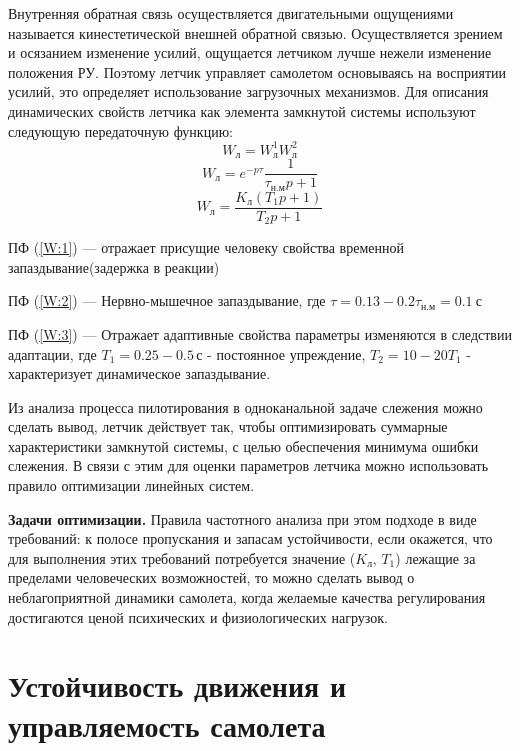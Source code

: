 \documentclass{article}
\begin{document}
Внутренняя обратная связь осуществляется двигательными ощущениями называется
кинестетической внешней обратной связью. Осуществляется зрением и осязанием
изменение усилий, ощущается летчиком лучше нежели изменение положения РУ.
Поэтому летчик управляет самолетом основываясь на восприятии усилий, это
определяет использование загрузочных механизмов. Для описания динамических
свойств летчика как элемента замкнутой системы используют следующую
передаточную функцию:
\begin{equation} \label{W:1}
	W_\text{л} = W_\text{л}^1 W_\text{л}^2
\end{equation}
\begin{equation} \label{W:2}
	W_\text{л} = e^{-p\tau} \frac{1}{\tau_\text{н.м} p +1}
\end{equation}
\begin{equation} \label{W:3}
	W_\text{л} = \frac{K_\text{л}(T_1 p + 1)}{T_2 p +1}
\end{equation}

ПФ (\ref{W:1}) --- отражает присущие человеку свойства временной
запаздывание(задержка в реакции)

ПФ (\ref{W:2}) --- Нервно-мышечное запаздывание, где $\tau = 0.13 - 0.2
	\tau_\text{н.м}= 0.1 \ \text{с}$ 

ПФ (\ref{W:3}) --- Отражает адаптивные свойства параметры изменяются в
следствии адаптации, где $T_1 = 0.25 - 0.5 \, \text{с}$ - постоянное упреждение,
$T_2 = 10 - 20  T_1$ - характеризует динамическое запаздывание.

Из анализа процесса пилотирования в одноканальной задаче слежения можно сделать
вывод, летчик действует так, чтобы оптимизировать суммарные характеристики
замкнутой системы, с целью обеспечения минимума ошибки слежения. В связи с этим
для оценки параметров летчика можно использовать правило оптимизации линейных
систем.

\textbf{Задачи оптимизации.} Правила частотного анализа при этом подходе в виде
требований: к полосе пропускания и запасам устойчивости, если окажется, что для
выполнения этих требований потребуется значение ($K_\text{л}, \, T_1$) лежащие
за пределами человеческих возможностей, то можно сделать вывод о
неблагоприятной динамики самолета, когда желаемые качества регулирования
достигаются ценой психических и физиологических нагрузок.

\section{Устойчивость движения и управляемость самолета}
\end{document}
